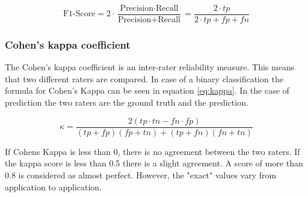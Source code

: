 \begin{equation}
    \label{eq:f1_score}
    \text{F1-Score} = 2 \cdot \frac{\text{Precision} \cdot \text{Recall}}{\text{Precision} + \text{Recall}} = \frac{2 \cdot tp}{2 \cdot tp + fp + fn}
\end{equation}

\subsubsection{Cohen's kappa coefficient}

The Cohen's kappa coefficient is an inter-rater reliability measure\cite{kappa}. This means that two different raters are compared. In case of a binary classification the formula for Cohen's Kappa can be seen in equation \ref{eq:kappa}. In the case of prediction the two raters are the ground truth and the prediction.

\begin{equation}
    \label{eq:kappa}
    \kappa = \frac{2(tp \cdot tn - fn \cdot fp)}{(tp + fp)(fp+tn) + (tp + fn)(fn + tn)}
\end{equation}

If Cohens Kappa is less than 0, there is no agreement between the two raters. If the kappa score is less than 0.5 there is a slight agreement. A score of more than 0.8 is considered as almost perfect. However, the "exact" values vary from application to application.
